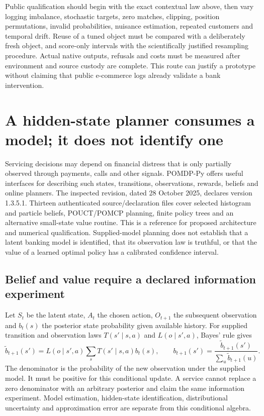 Public qualification should begin with the exact contextual law above, then
vary logging imbalance, stochastic targets, zero matches, clipping, position
permutations, invalid probabilities, nuisance estimation, repeated customers
and temporal drift. Reuse of a tuned object must be compared with a deliberately
fresh object, and score-only intervals with the scientifically justified
resampling procedure. Actual native outputs, refusals and costs must be
measured after environment and source custody are complete. This route can
justify a prototype without claiming that public e-commerce logs already
validate a bank intervention.


\section{A hidden-state planner consumes a model; it does not identify one}
\label{exec23:pomdppy-scope}
Servicing decisions may depend on financial distress that is only partially
observed through payments, calls and other signals. POMDP-Py offers useful
interfaces for describing such states, transitions, observations, rewards,
beliefs and online planners. The inspected revision, dated 28 October 2025,
declares version 1.3.5.1. Thirteen authenticated source/declaration files cover
selected histogram and particle beliefs, POUCT/POMCP planning, finite policy
trees and an alternative small-state value routine. This is a reference for
proposed architecture and numerical qualification. Supplied-model planning
does not establish that a latent banking model is identified, that its observation
law is truthful, or that the value of a learned optimal policy has a calibrated
confidence interval. \cite{exec23_pomdppy_sources}

\subsection{Belief and value require a declared information experiment}
\label{exec23:pomdppy-belief}
Let $S_t$ be the latent state, $A_t$ the chosen action, $O_{t+1}$ the subsequent
observation and $b_t(s)$ the posterior state probability given available
history. For supplied transition and observation laws $T(s'\mid s,a)$ and
$L(o\mid s',a)$, Bayes' rule gives
\[
 \widetilde b_{t+1}(s')=L(o\mid s',a)\sum_sT(s'\mid s,a)b_t(s),
 \qquad b_{t+1}(s')=\frac{\widetilde b_{t+1}(s')}
 {\sum_u\widetilde b_{t+1}(u)}.
\]
The denominator is the probability of the new observation under the supplied
model. It must be positive for this conditional update. A service cannot
replace a zero denominator with an arbitrary posterior and claim the same
information experiment. Model estimation, hidden-state identification,
distributional uncertainty and approximation error are separate from this
conditional algebra.


